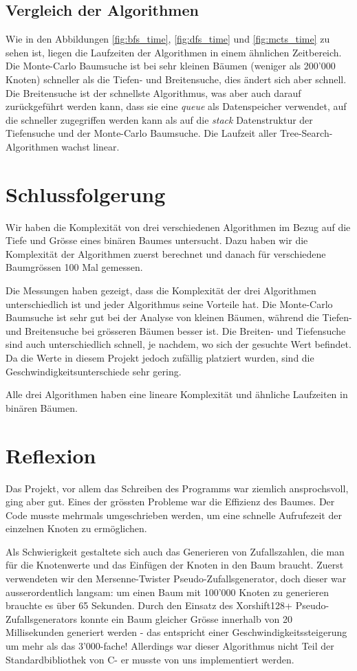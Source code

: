 \documentclass[a4paper,11pt]{article}
\newcommand{\CC}{C\nolinebreak\hspace{-.05em}\raisebox{.4ex}{\tiny\bf +}\nolinebreak\hspace{-.10em}\raisebox{.4ex}{\tiny\bf +}\hspace{.1em}}
\begin{document}
\subsection{Vergleich der Algorithmen}
Wie in den Abbildungen \ref{fig:bfs_time}, \ref{fig:dfs_time} und \ref{fig:mcts_time} zu sehen ist, liegen die Laufzeiten der Algorithmen in einem ähnlichen Zeitbereich. Die Monte-Carlo Baumsuche ist bei sehr kleinen Bäumen (weniger als 200'000 Knoten) schneller als die Tiefen- und Breitensuche, dies ändert sich aber schnell. Die Breitensuche ist der schnellste Algorithmus, was aber auch darauf zurückgeführt werden kann, dass sie eine \emph{queue} als Datenspeicher verwendet, auf die schneller zugegriffen werden kann als auf die \emph{stack} Datenstruktur der Tiefensuche und der Monte-Carlo Baumsuche. Die Laufzeit aller Tree-Search-Algorithmen wachst linear.

\section{Schlussfolgerung}
Wir haben die Komplexität von drei verschiedenen Algorithmen im Bezug auf die Tiefe und Grösse eines binären Baumes untersucht. Dazu haben wir die Komplexität der Algorithmen zuerst berechnet und danach für verschiedene Baumgrössen 100 Mal gemessen.

Die Messungen haben gezeigt, dass die Komplexität der drei Algorithmen unterschiedlich ist und jeder Algorithmus seine Vorteile hat. Die Monte-Carlo Baumsuche ist sehr gut bei der Analyse von kleinen Bäumen, während die Tiefen- und Breitensuche bei grösseren Bäumen besser ist. Die Breiten- und Tiefensuche sind auch unterschiedlich schnell, je nachdem, wo sich der gesuchte Wert befindet. Da die Werte in diesem Projekt jedoch zufällig platziert wurden, sind die Geschwindigkeitsunterschiede sehr gering.

Alle drei Algorithmen haben eine lineare Komplexität und ähnliche Laufzeiten in binären Bäumen.

\section{Reflexion}
Das Projekt, vor allem das Schreiben des Programms war ziemlich ansprochsvoll, ging aber gut. Eines der grössten Probleme war die Effizienz des Baumes. Der Code musste mehrmals umgeschrieben werden, um eine schnelle Aufrufezeit der einzelnen Knoten zu ermöglichen.

Als Schwierigkeit gestaltete sich auch das Generieren von Zufallszahlen, die man für die Knotenwerte und das Einfügen der Knoten in den Baum braucht. Zuerst verwendeten wir den Mersenne-Twister Pseudo-Zufallsgenerator, doch dieser war ausserordentlich langsam: um einen Baum mit 100'000 Knoten zu generieren brauchte es über 65 Sekunden. Durch den Einsatz des Xorshift128+ Pseudo-Zufallsgenerators konnte ein Baum gleicher Grösse innerhalb von 20 Millisekunden generiert werden - das entspricht einer Geschwindigkeitssteigerung um mehr als das 3'000-fache! Allerdings war dieser Algorithmus nicht Teil der Standardbibliothek von \CC - er musste von uns implementiert werden.
\end{document}
